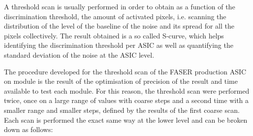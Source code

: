 		    A threshold scan is usually performed in order to obtain as a function of the discrimination threshold, the amount of activated pixels, i.e. scanning the distribution of the level of the baseline of the noise and its spread for all the pixels collectively. The result obtained is a so called S-curve, which helps identifying the discrimination threshold per ASIC as well as quantifying the standard deviation of the noise at the ASIC level. 
		    
		    The procedure developed for the threshold scan of the FASER production ASIC on module is the result of the optimisation of precision of the result and time available to test each module. For this reason, the threshold scan were performed twice, once on a large range of values with coarse steps and a second time with a smaller range and smaller steps, defined by the results of the first coarse scan. 
		    Each scan is performed the exact same way at the lower level and can be broken down as follows: 
		    

